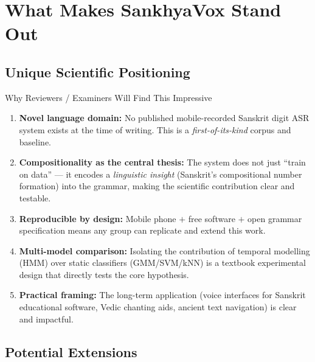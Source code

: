 \documentclass[12pt,a4paper]{article}
\begin{document}
\section{What Makes SankhyaVox Stand Out}

\subsection{Unique Scientific Positioning}

\begin{keybox}{Why Reviewers / Examiners Will Find This Impressive}
\begin{enumerate}[leftmargin=1.5em, itemsep=4pt]
  \item \textbf{Novel language domain:} No published mobile-recorded Sanskrit
        digit ASR system exists at the time of writing.
        This is a \emph{first-of-its-kind} corpus and baseline.
  \item \textbf{Compositionality as the central thesis:} The system does not
        just ``train on data'' --- it encodes a \emph{linguistic insight}
        (Sanskrit's compositional number formation) into the grammar, making
        the scientific contribution clear and testable.
  \item \textbf{Reproducible by design:} Mobile phone $+$ free software $+$
        open grammar specification means any group can replicate and extend
        this work.
  \item \textbf{Multi-model comparison:} Isolating the contribution of
        temporal modelling (HMM) over static classifiers (GMM/SVM/kNN) is
        a textbook experimental design that directly tests the core hypothesis.
  \item \textbf{Practical framing:} The long-term application
        (voice interfaces for Sanskrit educational software, Vedic chanting
        aids, ancient text navigation) is clear and impactful.
\end{enumerate}
\end{keybox}

\subsection{Potential Extensions}
\end{document}
